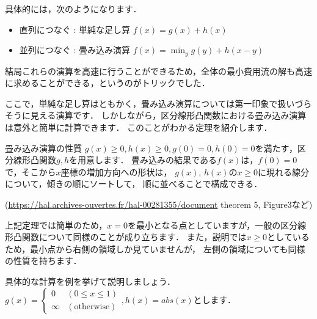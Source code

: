 \documentclass[13pt]{jarticle}
\begin{document}
具体的には，次のようになります．
\begin{itemize}
\item 直列につなぐ : 単純な足し算 $f(x) = g(x) + h(x)$
\item 並列につなぐ : 畳み込み演算 $f(x) = \min_y {g(y) + h(x-y)}$
\end{itemize}
結局これらの演算を高速に行うことができるため，全体の最小費用流の解も高速に求めることができる，というのがトリックでした．

ここで，単純な足し算はともかく，畳み込み演算については第一印象で扱いづらそうに見える演算です．
しかしながら，区分線形凸関数における畳み込み演算は意外と簡単に計算できます．
このことがわかる定理を紹介します．

\begin{itembox}[l]{畳み込み演算の性質}
$g(x) \geq 0, h(x) \geq 0, g(0)=0, h(0)=0$を満たす，区分線形凸関数$g,h$を用意します．
畳み込みの結果である$f(x)$は，$f(0)=0$で，そこから$x$座標の増加方向への形状は，
$g(x)$, $h(x)$の$x\geq 0$に現れる線分について，傾きの順にソートして，
順に並べることで構成できる．

(\url{https://hal.archives-ouvertes.fr/hal-00281355/document} theorem 5, Figure3など)
\end{itembox}
上記定理では簡単のため，$x=0$を最小となる点としていますが，一般の区分線形凸関数について同様のことが成り立ちます．
また，説明では$x \geq 0$としているため，最小点から右側の領域しか見ていませんが，
左側の領域についても同様の性質を持ちます．


具体的な計算を例を挙げて説明しましょう．
$g(x) = 
\begin{cases}
0 & (0 \leq x \leq 1) \\
 \infty &  (\text{otherwise})
\end{cases}
, h(x) = abs(x)$とします．
\end{document}
